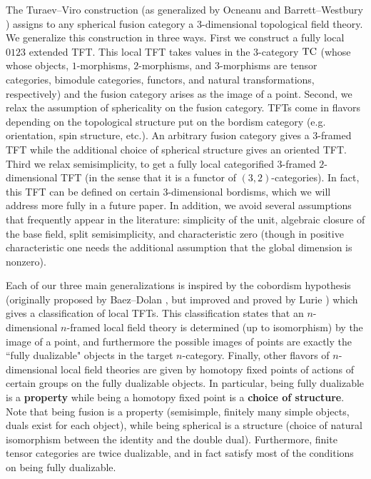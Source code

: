 \documentclass{amsart}
\begin{document}
The Turaev--Viro \cite{MR1191386, MR1292673} construction (as generalized by Ocneanu \cite{MR1317353} and Barrett--Westbury \cite{MR1686423}) assigns to any spherical fusion category a 3-dimensional topological field theory.  We generalize this construction in three ways.  First we construct a fully local $0123$ extended TFT.  This local TFT takes values in the $3$-category $\mathrm{TC}$ (whose whose objects, $1$-morphisms, $2$-morphisms, and $3$-morphisms are tensor categories, bimodule categories, functors, and natural transformations, respectively) and the fusion category arises as the image of a point.  Second, we relax the assumption of sphericality on the fusion category.  TFTs come in flavors depending on the topological structure put on the bordism category (e.g. orientation, spin structure, etc.).  An arbitrary fusion category gives a $3$-framed TFT while the additional choice of spherical structure gives an oriented TFT.  Third we relax semisimplicity, to get a fully local categorified $3$-framed $2$-dimensional TFT (in the sense that it is a functor of $(3,2)$-categories).  In fact, this TFT can be defined on certain $3$-dimensional bordisms, which we will address more fully in a future paper.  In addition, we avoid several assumptions that frequently appear in the literature: simplicity of the unit, algebraic closure of the base field, split semisimplicity, and characteristic zero (though in positive characteristic one needs the additional assumption that the global dimension is nonzero).

Each of our three main generalizations is inspired by the cobordism hypothesis (originally proposed by Baez--Dolan \cite{MR1355899}, but improved and proved by Lurie \cite{0905.0465}) which gives a classification of local TFTs.  This classification states that an $n$-dimensional $n$-framed local field theory is determined (up to isomorphism) by the image of a point, and furthermore the possible images of points are exactly the ``fully dualizable" objects in the target $n$-category.  Finally, other flavors of $n$-dimensional local field theories are given by homotopy fixed points of actions of certain groups on the fully dualizable objects.  In particular, being fully dualizable is a {\bf property} while being a homotopy fixed point is a {\bf choice of structure}.  Note that being fusion is a property (semisimple, finitely many simple objects, duals exist for each object), while being spherical is a structure (choice of natural isomorphism between the identity and the double dual).  Furthermore, finite tensor categories are twice dualizable, and in fact satisfy most of the conditions on being fully dualizable.
\end{document}
